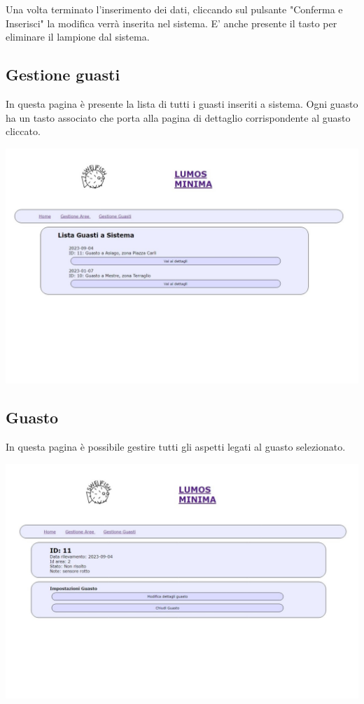 \documentclass[9pt]{article}
\begin{document}
Una volta terminato l'inserimento dei dati, cliccando sul pulsante "Conferma e Inserisci"
la modifica verrà inserita nel sistema.
E' anche presente il tasto per eliminare il lampione dal sistema.


\subsection{Gestione guasti}
In questa pagina è presente la lista di tutti i guasti inseriti a sistema.
Ogni guasto ha un tasto associato che porta alla pagina di dettaglio corrispondente al guasto cliccato.

\begin{center}
	\includegraphics[scale=0.3]{Gestione_guasti.png}
\end{center}

\subsection{Guasto}

In questa pagina è possibile gestire tutti gli aspetti legati al guasto selezionato.

\begin{center}
	\includegraphics[scale=0.3]{Guasto.png}
\end{center}
\end{document}
